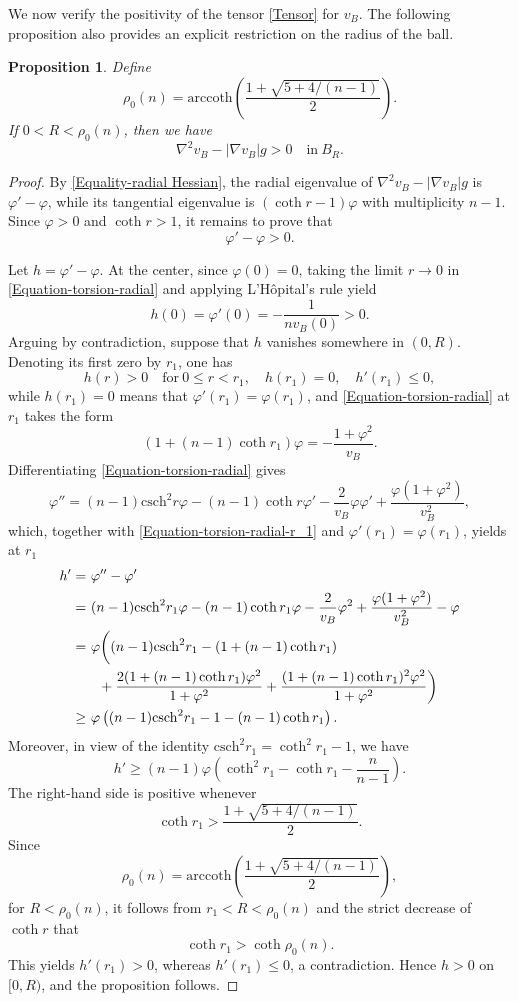 \documentclass[11pt]{amsart}
\newtheorem{proposition}[theorem]{Proposition}
\numberwithin{theorem}{section}
\numberwithin{equation}{section}
\begin{document}
We now verify the positivity of the tensor \eqref{Tensor} for $v_B$. The following proposition also provides an explicit restriction on the radius of the ball.
\begin{proposition}\label{Proposition-ball case}
Define
\begin{equation}
\rho_0(n)=\mathrm{arccoth}\left(\frac{1+\sqrt{5+4/(n-1)}}{2}\right).
\end{equation}
If $0<R<\rho_0(n)$, then we have $$\nabla^2v_B-|\nabla v_B|g>0\quad \mathrm{in}\ B_R.$$
\end{proposition}
\begin{proof}
By \eqref{Equality-radial Hessian}, the radial eigenvalue of $\nabla^2v_B-|\nabla v_B|g$ is $\varphi'-\varphi$, while its tangential eigenvalue is $(\coth r-1)\varphi$ with multiplicity $n-1$. Since $\varphi>0$ and $\coth r>1$, it remains to prove that $$\varphi'-\varphi>0.$$

Let $h=\varphi'-\varphi$. At the center, since $\varphi(0)=0$, taking the limit $r\rightarrow 0$ in \eqref{Equation-torsion-radial} and applying L'H\^{o}pital's rule yield $$h(0)=\varphi'(0)=-\frac{1}{nv_B(0)}>0.$$ Arguing by contradiction, suppose that $h$ vanishes somewhere in $(0,R)$. Denoting its first zero by $r_1$, one has $$h(r)>0\quad\mathrm{for}\ 0\leq r<r_1,\quad h(r_1)=0,\quad h'(r_1)\leq 0,$$ while $h(r_1)=0$ means that $\varphi'(r_1)=\varphi(r_1)$, and \eqref{Equation-torsion-radial} at $r_1$ takes the form
\begin{equation}\label{Equation-torsion-radial-r_1}
(1+(n-1)\coth r_1)\varphi=-\frac{1+\varphi^2}{v_B}.
\end{equation}
Differentiating \eqref{Equation-torsion-radial} gives $$\varphi''=(n-1)\mathrm{csch}^2r\varphi-(n-1)\coth r\varphi'-\frac{2}{v_B}\varphi\varphi'+\frac{\varphi(1+\varphi^2)}{v_B^2},$$ which, together with \eqref{Equation-torsion-radial-r_1} and $\varphi'(r_1)=\varphi(r_1)$, yields at $r_1$
\begin{align*}
h'
=&~\varphi''-\varphi'\\
=&~(n-1)\mathrm{csch}^2r_1\varphi-(n-1)\coth r_1\varphi-\frac{2}{v_B}\varphi^2+\frac{\varphi(1+\varphi^2)}{v_B^2}-\varphi\\
=&~\varphi\bigg((n-1)\mathrm{csch}^2r_1-(1+(n-1)\coth r_1)\\
&\hspace{0.3cm}+\frac{2(1+(n-1)\coth r_1)\varphi^2}{1+\varphi^2}+\frac{(1+(n-1)\coth r_1)^2\varphi^2}{1+\varphi^2}\bigg)\\
\geq&~\varphi\left((n-1)\mathrm{csch}^2r_1-1-(n-1)\coth r_1\right).
\end{align*}
Moreover, in view of the identity $\mathrm{csch}^2r_1=\coth^2r_1-1$, we have $$h'\geq(n-1)\varphi\left(\coth^2r_1-\coth r_1-\frac{n}{n-1}\right).$$ The right-hand side is positive whenever $$\coth r_1>\frac{1+\sqrt{5+4/(n-1)}}{2}.$$ Since $$\rho_0(n)=\mathrm{arccoth}\left(\frac{1+\sqrt{5+4/(n-1)}}{2}\right),$$ for $R<\rho_0(n)$, it follows from $r_1<R<\rho_0(n)$ and the strict decrease of $\coth r$ that $$\coth r_1>\coth\rho_0(n).$$
This yields $h'(r_1)>0$, whereas $h'(r_1)\leq 0$, a contradiction. Hence $h>0$ on $[0,R)$, and the proposition follows.
\end{proof}
\end{document}

